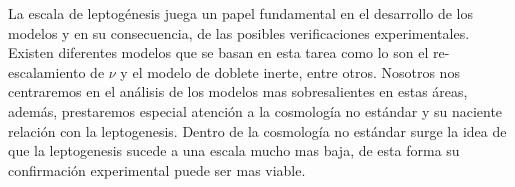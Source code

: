 La escala de leptogénesis juega un papel fundamental en el desarrollo de los modelos y en su consecuencia, de las posibles verificaciones experimentales. Existen diferentes modelos que se basan en esta tarea como lo son el re-escalamiento de $\nu$ y el modelo de doblete inerte, entre otros. Nosotros nos centraremos en el análisis de los modelos mas sobresalientes en estas áreas, además, prestaremos especial atención a la cosmología no estándar y su naciente relación con la leptogenesis. 
Dentro de la cosmología no estándar surge la idea de que la leptogenesis sucede a una escala mucho mas baja, de esta forma su confirmación experimental puede ser mas viable.